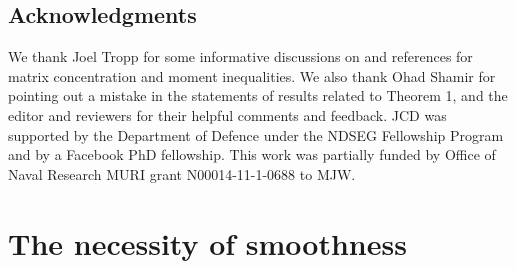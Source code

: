 \documentclass[11pt,twoside]{article}
\theoremstyle{definition}
\begin{document}
\subsection*{Acknowledgments}

We thank Joel Tropp for some informative discussions on and references for
matrix concentration and moment inequalities. We also thank Ohad Shamir for
pointing out a mistake in the statements of results related to Theorem 1, and
the editor and reviewers for their helpful comments and feedback.  JCD was
supported by the Department of Defence under the NDSEG Fellowship Program and
by a Facebook PhD fellowship.  This work was partially funded by Office of
Naval Research MURI grant N00014-11-1-0688 to MJW.





\appendix


\section{The necessity of smoothness}
\label{appendix:smoothness-necessary}
\newcommand{\floor}[1]{\left\lfloor{#1}\right\rfloor}
\end{document}

